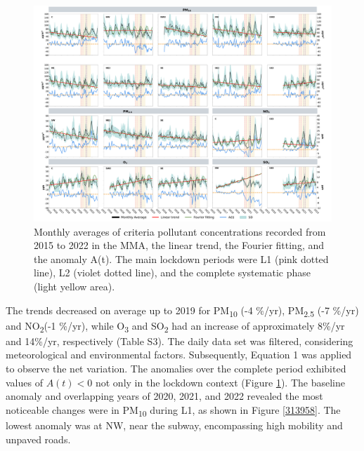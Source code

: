 \documentclass[sn-mathphys-num]{sn-jnl}
\begin{document}
\begin{figure}[H]
	\begin{center}
		\includegraphics[width=1.00\textwidth]{figures/monthly_fourier.pdf}
		\caption{{Monthly averages of criteria pollutant concentrations recorded from 2015 to 2022 in the MMA, the linear trend, the Fourier fitting, and the anomaly A(t). The main lockdown periods were L1 (pink dotted line), L2 (violet dotted line), and the complete systematic phase (light yellow area).
						{\label{686668}}%
				}}
	\end{center}
\end{figure}
The trends decreased on average up to 2019 for PM\textsubscript{10} (-4 \%/yr), PM\textsubscript{2.5} (-7 \%/yr) and NO\textsubscript{2}(-1 \%/yr), while O\textsubscript{3} and SO\textsubscript{2} had an increase of approximately 8\%/yr and 14\%/yr, respectively (Table S3). The daily data set was filtered, considering meteorological and environmental factors. Subsequently, Equation 1 was applied to observe the net variation. The anomalies over the complete period exhibited values of \(A\left(t\right)<0\) not only in the lockdown context (Figure \ref{686668}). The baseline anomaly and overlapping years of 2020, 2021, and 2022 revealed the most noticeable changes were in PM\textsubscript{10} during L1, as shown in Figure \ref{313958}. The lowest anomaly was at NW, near the subway, encompassing high mobility and unpaved roads.
\end{document}
